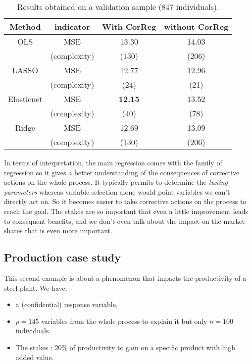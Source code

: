 \documentclass[11pt,a4paper]{article}
\begin{document}
		\begin{table}[h!]
\centering
\begin{tabular}{|c c|c|c|}
	\hline 
	Method& indicator& With CorReg & without CorReg \\ 
	\hline 
	OLS & MSE & 13.30 & 14.03 \\
		& (complexity)& (130) & (206) \\
	\hline
	LASSO & MSE & 12.77 & 12.96 \\
		& (complexity)& (24) & (21) \\
	\hline
	Elasticnet & MSE & \textbf{12.15} & 13.52 \\
		& (complexity)& (40) & (78) \\
	\hline
	Ridge & MSE & 12.69 & 13.09 \\
		& (complexity)& (130) & (206) \\
	\hline
\end{tabular} 
\caption{Results obtained on a validation sample (847 individuals).}\label{Res_exfos}
\end{table}


		In terms of interpretation, the main regression comes with the family of regression so it gives a better understanding of the consequences of corrective actions on the whole process. It typically permits to determine the \textit{tuning parameters} whereas variable selection alone would point variables we can't directly act on.	So it becomes easier to take corrective actions on the process to reach the goal. The stakes are so important that even a little improvement leads to consequent benefits, and we don't even talk about the impact on the market shares that is even more important.
		\FloatBarrier
		\subsection{Production case study}
This second example is about a phenomenon that impacts the productivity of a steel plant.
We have:
		\begin{itemize}
			\item a (confidential)  response variable,
			\item $p=145$ variables from the whole process to explain it but only $n=100$ individuals.
			\item The stakes : $20\%$ of productivity to gain on a specific product with high added value.
		\end{itemize}
		
\end{document}
